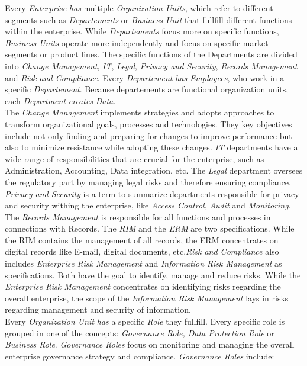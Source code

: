 \documentclass[
  a4paper,  %
  twoside,  %
  bibliography=totoc,
  headsepline,
  cleardoublepage=empty,
  parskip=half,
  draft=false
]{scrbook}
\begin{document}
Every \textit{Enterprise} \textit{has} multiple \textit{Organization Units}, which refer to different segments such as \textit{Departements} or \textit{Business Unit} that fullfill different functions within the enterprise. While \textit{Departements} focus more on specific functions, \textit{Business Units} operate more independently and focus on specific market segments or product lines. The specific functions of the Departments are divided into \textit{Change Management}, \textit{IT}, \textit{Legal}, \textit{Privacy and Security}, \textit{Records Management} and \textit{Risk and Compliance}. Every \textit{Departement} \textit{has} \textit{Employees}, who work in a specific \textit{Departement}. Because departements are functional organization units, each \textit{Department} \textit{creates} \textit{Data}. \\
The \textit{Change Management} implements strategies and adopts approaches to transform organizational goals, processes and technologies. They key objectives include not only finding and preparing for changes to improve performance but also to minimize resistance while adopting these changes. \textit{IT} departments have a wide range of responsibilities that are crucial for the enterprise, such as Administration, Accounting, Data integration, etc. The \textit{Legal} department oversees the regulatory part by managing legal risks and therefore ensuring compliance. \textit{Privacy and Security} is a term to summarize departments responsible for privacy and security withing the enterprise, like \textit{Access Control}, \textit{Audit} and \textit{Monitoring}. The \textit{Records Management} is responsible for all functions and processes in connections with Records. The \textit{\acrfull{RIM}} and the \textit{\acrfull{ERM}} are two specifications. While the \acrshort{RIM} contains the management of all records, the \acrshort{ERM} concentrates on digital records like E-mail, digital documents, etc.\textit{Risk and Compliance} also includes \textit{Enterprise Risk  Management} and \textit{Information Risk Management} as specifications. Both have the goal to identify, manage and reduce risks. While the \textit{Enterprise Risk Management} concentrates on identifying risks regarding the overall enterprise, the scope of the \textit{Information Risk Management} lays in risks regarding management and security of information. \\

Every \textit{Organization Unit} \textit{has} a specific \textit{Role} they fullfill. Every specific role is grouped in one of the concepts: \textit{Governance Role, Data Protection Role} or \textit{Business Role}. \textit{Governance Roles} focus on monitoring and managing the overall enterprise governance strategy and compliance. \textit{Governance Roles} include: 
\end{document}
